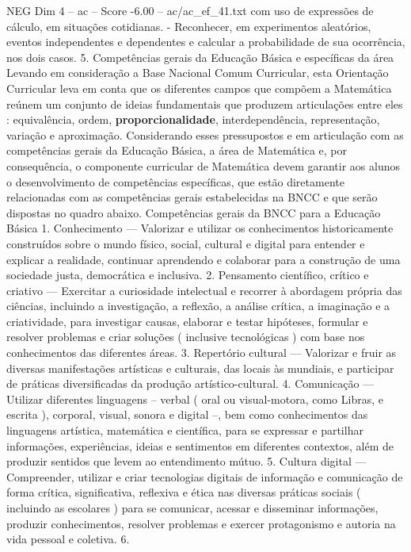 \begin{textsample}{NEG Dim 4 – ac – Score -6.00 – ac/ac\_ef\_41.txt}
com uso de expressões de cálculo, em situações cotidianas. - Reconhecer, em experimentos aleatórios, eventos independentes e dependentes e calcular a probabilidade de sua ocorrência, nos dois casos. 5.
Competências gerais da Educação Básica e específicas da área Levando em consideração a Base Nacional Comum Curricular, esta Orientação Curricular leva em conta que os diferentes campos que compõem a Matemática reúnem um conjunto de ideias fundamentais que produzem articulações entre eles : equivalência, ordem, \textbf{proporcionalidade}, interdependência, representação, variação e aproximação.
Considerando esses pressupostos e em articulação com as competências gerais da Educação Básica, a área de Matemática e, por consequência, o componente curricular de Matemática devem garantir aos alunos o desenvolvimento de competências específicas, que estão diretamente relacionadas com as competências gerais estabelecidas na BNCC e que serão dispostas no quadro abaixo.
Competências gerais da BNCC para a Educação Básica 1.
Conhecimento — Valorizar e utilizar os conhecimentos historicamente construídos sobre o mundo físico, social, cultural e digital para entender e explicar a realidade, continuar aprendendo e colaborar para a construção de uma sociedade justa, democrática e inclusiva. 2.
Pensamento científico, crítico e criativo — Exercitar a curiosidade intelectual e recorrer à abordagem própria das ciências, incluindo a investigação, a reflexão, a análise crítica, a imaginação e a criatividade, para investigar causas, elaborar e testar hipóteses, formular e resolver problemas e criar soluções ( inclusive tecnológicas ) com base nos conhecimentos das diferentes áreas. 3.
Repertório cultural — Valorizar e fruir as diversas manifestações artísticas e culturais, das locais às mundiais, e participar de práticas diversificadas da produção artístico-cultural. 4.
Comunicação — Utilizar diferentes linguagens – verbal ( oral ou visual-motora, como Libras, e escrita ), corporal, visual, sonora e digital –, bem como conhecimentos das linguagens artística, matemática e científica, para se expressar e partilhar informações, experiências, ideias e sentimentos em diferentes contextos, além de produzir sentidos que levem ao entendimento mútuo. 5.
Cultura digital — Compreender, utilizar e criar tecnologias digitais de informação e comunicação de forma crítica, significativa, reflexiva e ética nas diversas práticas sociais ( incluindo as escolares ) para se comunicar, acessar e disseminar informações, produzir conhecimentos, resolver problemas e exercer protagonismo e autoria na vida pessoal e coletiva. 6.

\end{textsample}
